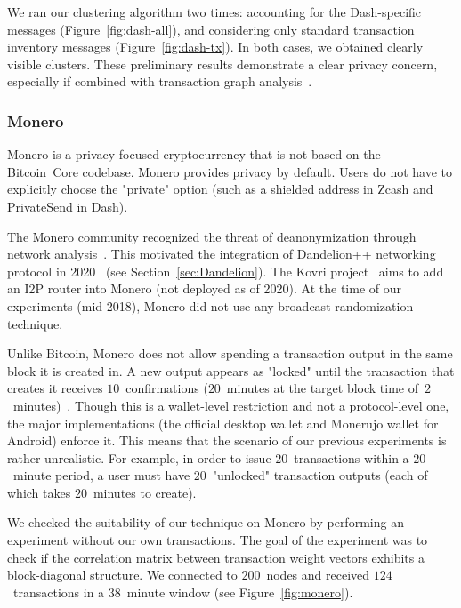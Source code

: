 We ran our clustering algorithm two times: accounting for the Dash-specific messages (Figure~\ref{fig:dash-all}), and considering only standard transaction inventory messages (Figure~\ref{fig:dash-tx}).
In both cases, we obtained clearly visible clusters.
These preliminary results demonstrate a clear privacy concern, especially if combined with transaction graph analysis~\cite{Kalodner2017}. 


\subsubsection{Monero}

Monero is a privacy-focused cryptocurrency that is not based on the Bitcoin~Core codebase.
Monero provides privacy by default.
Users do not have to explicitly choose the "private" option (such as a shielded address in Zcash and PrivateSend in Dash).

The Monero community recognized the threat of deanonymization through network analysis~\cite{user36432017, manontheinside2016, expez2016, Cameron2016}.
This motivated the integration of Dandelion++ networking protocol in 2020~\cite{ErCiccione2020} (see Section~\ref{sec:Dandelion}).
The Kovri project~\cite{Kovri} aims to add an I2P router into Monero (not deployed as of 2020).
At the time of our experiments (mid-2018), Monero did not use any broadcast randomization technique.

Unlike Bitcoin, Monero does not allow spending a transaction output in the same block it is created in.
A new output appears as "locked" until the transaction that creates it receives $10$~confirmations ($20$~minutes at the target block time of~$2$~minutes)~\cite{dpzz2017}.
Though this is a wallet-level restriction and not a protocol-level one, the major implementations (the official desktop wallet and Monerujo wallet for Android) enforce it.
This means that the scenario of our previous experiments is rather unrealistic.
For example, in order to issue $20$~transactions within a $20$~minute period, a user must have $20$~"unlocked" transaction outputs (each of which takes $20$~minutes to create).

We checked the suitability of our technique on Monero by performing an experiment without our own transactions.
The goal of the experiment was to check if the correlation matrix between transaction weight vectors exhibits a block-diagonal structure.
We connected to $200$~nodes and received $124$~transactions in a $38$~minute window (see Figure~\ref{fig:monero}).

